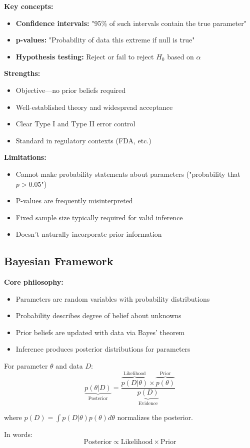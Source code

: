 \textbf{Key concepts:}
\begin{itemize}
    \item \textbf{Confidence intervals:} "95\% of such intervals contain the true parameter"
    \item \textbf{p-values:} "Probability of data this extreme if null is true"
    \item \textbf{Hypothesis testing:} Reject or fail to reject $H_0$ based on $\alpha$
\end{itemize}

\textbf{Strengths:}
\begin{itemize}
    \item Objective—no prior beliefs required
    \item Well-established theory and widespread acceptance
    \item Clear Type I and Type II error control
    \item Standard in regulatory contexts (FDA, etc.)
\end{itemize}

\textbf{Limitations:}
\begin{itemize}
    \item Cannot make probability statements about parameters ("probability that $p > 0.05$")
    \item P-values are frequently misinterpreted
    \item Fixed sample size typically required for valid inference
    \item Doesn't naturally incorporate prior information
\end{itemize}

\subsection{Bayesian Framework}

\textbf{Core philosophy:}
\begin{itemize}
    \item Parameters are random variables with probability distributions
    \item Probability describes degree of belief about unknowns
    \item Prior beliefs are updated with data via Bayes' theorem
    \item Inference produces posterior distributions for parameters
\end{itemize}

\begin{theorem}
For parameter $\theta$ and data $D$:
\begin{equation}
\underbrace{p(\theta | D)}_{\text{Posterior}} = \frac{\overbrace{p(D | \theta)}^{\text{Likelihood}} \times \overbrace{p(\theta)}^{\text{Prior}}}{\underbrace{p(D)}_{\text{Evidence}}}
\end{equation}

where $p(D) = \int p(D | \theta) p(\theta) d\theta$ normalizes the posterior.

In words:
\begin{equation}
\text{Posterior} \propto \text{Likelihood} \times \text{Prior}
\end{equation}
\end{theorem}

